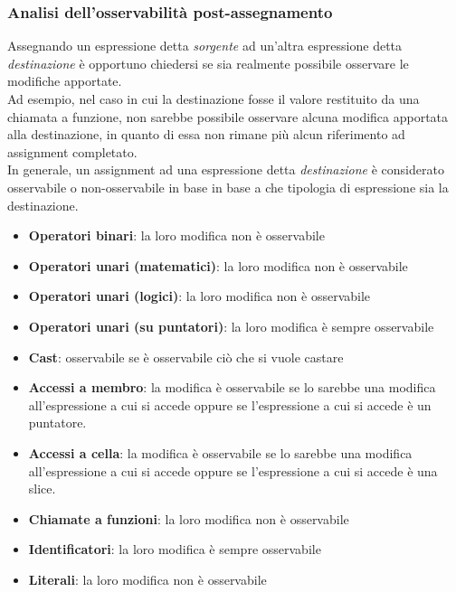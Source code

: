 \subsubsection{Analisi dell'osservabilità post-assegnamento}
Assegnando un espressione detta \textit{sorgente} ad un'altra espressione detta \textit{destinazione}
è opportuno chiedersi se sia realmente possibile osservare le modifiche apportate. \\

Ad esempio, nel caso in cui la destinazione fosse il valore restituito da una chiamata a funzione, 
non sarebbe possibile osservare alcuna modifica apportata alla destinazione, in quanto di essa non 
rimane più alcun riferimento ad assignment completato. \\

In generale, un assignment ad una espressione detta \textit{destinazione} è
considerato osservabile o non-osservabile in base in base a che tipologia di 
espressione sia la destinazione. \\

\vspace{0.5cm}
\begin{itemize}
    \item \textbf{Operatori binari}: la loro modifica non è osservabile
    \item \textbf{Operatori unari (matematici)}: la loro modifica non è osservabile
    \item \textbf{Operatori unari (logici)}: la loro modifica non è osservabile
    \item \textbf{Operatori unari (su puntatori)}: la loro modifica è sempre osservabile
    \item \textbf{Cast}: osservabile se è osservabile ciò che si vuole castare
    \item \textbf{Accessi a membro}: la modifica è osservabile se lo sarebbe una modifica 
    all'espressione a cui si accede oppure se l'espressione a cui si accede è un puntatore.
    \item \textbf{Accessi a cella}: la modifica è osservabile se lo sarebbe una modifica 
    all'espressione a cui si accede oppure se l'espressione a cui si accede è una slice.
    \item \textbf{Chiamate a funzioni}: la loro modifica non è osservabile
    \item \textbf{Identificatori}: la loro modifica è sempre osservabile
    \item \textbf{Literali}: la loro modifica non è osservabile
\end{itemize}
\vspace{0.5cm}

